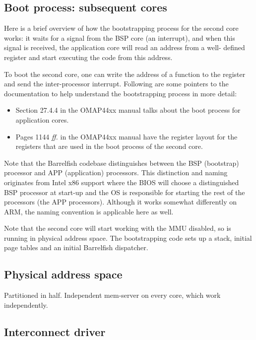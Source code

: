 \documentclass[a4paper,twoside]{report} %
\newcommand{\todo}[1]{\note{\textbf{TODO:} #1}}
\begin{document}
\todo{From AOS writeup?}

\subsection{Boot process: subsequent cores}


Here is a brief overview of how the bootstrapping process for the second core
works: it waits for a signal from the BSP core (an interrupt), and when this
signal is received, the application core will read an address from a well-
defined register and start executing the code from this address.

To boot the second core, one can write the address of
a function to the register and send the inter-processor
interrupt. Following are some pointers to the documentation to help
understand the bootstrapping process in more detail:

\begin{itemize}
\item Section 27.4.4 in the OMAP44xx manual talks about the boot process for
  application cores.
\item Pages 1144 \textit{ff.} in the OMAP44xx manual have the register
  layout for the registers that are used in the boot process of the
  second core. 
\end{itemize}

Note that the Barrelfish codebase distinguishes between the BSP (bootstrap)
processor and APP (application) processors. This distinction and naming
originates from Intel x86 support where the BIOS will choose a
distinguished BSP processor at start-up and the OS 
is responsible for starting the rest of the processors (the APP
processors). Although it works somewhat differently on 
ARM, the naming convention is applicable here as well.

Note that the second core will start working with the MMU disabled, so
is running in physical address space.  The bootstrapping code sets up a
stack, initial page tables and an initial Barrelfish dispatcher. 

\subsection{Physical address space}

Partitioned in half. Independent mem-server on every core, which work
independently.

\subsection{Interconnect driver}\label{sec:interconnect}
\end{document}
